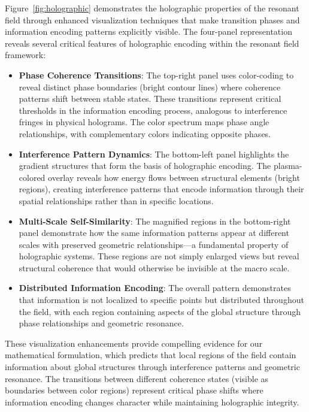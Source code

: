 \documentclass[12pt,letterpaper]{article}
\begin{document}
Figure~\ref{fig:holographic} demonstrates the holographic properties of the resonant field through enhanced visualization techniques that make transition phases and information encoding patterns explicitly visible. The four-panel representation reveals several critical features of holographic encoding within the resonant field framework:

\begin{itemize}
    \item \textbf{Phase Coherence Transitions}: The top-right panel uses color-coding to reveal distinct phase boundaries (bright contour lines) where coherence patterns shift between stable states. These transitions represent critical thresholds in the information encoding process, analogous to interference fringes in physical holograms. The color spectrum maps phase angle relationships, with complementary colors indicating opposite phases.
    
    \item \textbf{Interference Pattern Dynamics}: The bottom-left panel highlights the gradient structures that form the basis of holographic encoding. The plasma-colored overlay reveals how energy flows between structural elements (bright regions), creating interference patterns that encode information through their spatial relationships rather than in specific locations.
    
    \item \textbf{Multi-Scale Self-Similarity}: The magnified regions in the bottom-right panel demonstrate how the same information patterns appear at different scales with preserved geometric relationships—a fundamental property of holographic systems. These regions are not simply enlarged views but reveal structural coherence that would otherwise be invisible at the macro scale.
    
    \item \textbf{Distributed Information Encoding}: The overall pattern demonstrates that information is not localized to specific points but distributed throughout the field, with each region containing aspects of the global structure through phase relationships and geometric resonance.
\end{itemize}

These visualization enhancements provide compelling evidence for our mathematical formulation, which predicts that local regions of the field contain information about global structures through interference patterns and geometric resonance. The transitions between different coherence states (visible as boundaries between color regions) represent critical phase shifts where information encoding changes character while maintaining holographic integrity.
\end{document}
